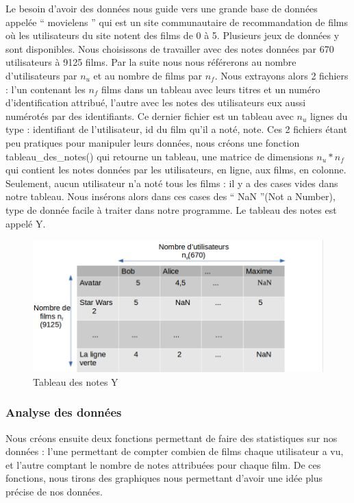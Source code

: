 \documentclass[a4paper,10pt]{article}
\begin{document}
Le besoin d'avoir des données nous guide vers une grande base de données appelée `` movielens '' qui est un site communautaire de recommandation de films où les utilisateurs du site notent des films de 0 à 5.
Plusieurs jeux de données y sont disponibles. 
Nous choisissons de travailler avec des notes données par 670 utilisateurs à 9125 films.
Par la suite nous nous référerons au nombre d'utilisateurs par $n_u$ et au nombre de films par $n_f$.
Nous extrayons alors 2 fichiers : l’un contenant les $n_f$ films dans un tableau avec leurs titres et un numéro d'identification attribué, 
l’autre avec les notes des utilisateurs eux aussi numérotés par des identifiants.
Ce dernier fichier est un tableau avec $n_u$ lignes du type : identifiant de l’utilisateur, id du film qu’il a noté, note. 
Ces 2 fichiers étant peu pratiques pour manipuler leurs données,  
nous créons une fonction tableau\_des\_notes() qui retourne un tableau, une matrice de dimensions $n_u * n_f$ qui contient les notes données par les utilisateurs, en ligne, aux films, en colonne. Seulement, aucun utilisateur n'a noté tous les films : il y a des cases vides dans notre tableau. Nous insérons alors dans ces cases des `` NaN ''(Not a Number), type de donnée facile à traiter dans notre programme.
Le tableau des notes est appelé Y.

\begin{figure}[H]
  \centering
  \includegraphics[scale=0.4]{Ynew.png}
  \caption{Tableau des notes Y}
\end{figure}

\subsubsection{Analyse des données}

Nous créons ensuite deux fonctions permettant de faire des statistiques sur nos données : l’une permettant de compter combien de films chaque utilisateur a vu, et l’autre comptant le nombre de notes attribuées pour chaque film. De ces fonctions, nous tirons des graphiques nous permettant d'avoir une idée plus précise de nos données.\\
\end{document}
